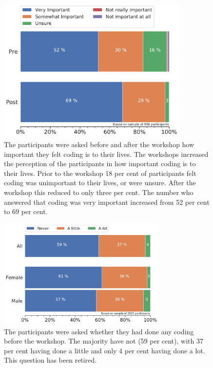 \documentclass[12pt]{report} %
\begin{document}
\begin{figure}[t!]
    \centering
        \includegraphics[width=0.85\textwidth]{bar_CodingImportance}
\caption{The participants were asked before and after the workshop how important they felt coding is to their lives. The workshops increased the perception of the participants in how important coding is to their lives. Prior to the workshop 18 per cent of participants felt coding was unimportant to their lives, or were unsure. After the workshop this reduced to only three per cent. The number who answered that coding was very important increased from 52 per cent to 69 per cent.}
\label{fig:ACcodingimportance}
\end{figure}

\begin{figure}[t!]
    \centering
        \includegraphics[width=0.75\textwidth]{bar_CodedBefore}
\caption{The participants were asked whether they had done any coding before the workshop. The majority have not (59 per cent), with 37 per cent having done a little and only 4 per cent having done a lot. This question has been retired. }
\label{fig:codedbefor}
\end{figure}
\end{document}
